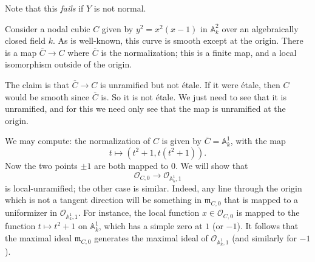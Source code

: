 Note that this \emph{fails} if $Y$ is not normal.
\begin{example} 
Consider a nodal cubic $C$ given by $y^2 = x^2 (x-1)$ in $\mathbb{A}^2_k$ over an
algebraically closed field $k$. As is well-known, this curve is smooth except
at the origin. There is a map $\overline{C} \to C$ where $\overline{C}$ is
the normalization; this is a finite map, and a local isomorphism outside of
the origin. 

The claim is that $\overline{C} \to C$ is unramified but not \'etale. If it
were \'etale, then $C$ would be smooth since $\overline{C}$ is. So it is not
\'etale. We just need to see that it is unramified, and for this we need only
see that the map is unramified at the origin.

We may compute: the normalization of $C$ is given by $\overline{C} =
\mathbb{A}^1_k$, with the map
\[ t \mapsto (t^2+1, t (t^2 + 1)).  \]
Now the two points $\pm 1$ are both mapped to $0$.
We will show that
\[ \mathcal{O}_{C, 0} \to \mathcal{O}_{\mathbb{A}^1_k, 1}  \]
is local-unramified; the other case is similar.
Indeed, any line through the origin which is not a tangent direction will be
something in $\mathfrak{m}_{C, 0}$ that is mapped to a uniformizer in $
\mathcal{O}_{\mathbb{A}^1_k, 1}$.
For instance, the local function $x \in \mathcal{O}_{C,0}$ is mapped to 
the function $t \mapsto t^2 + 1$ on $\mathbb{A}^1_k$, which has a simple zero
at $1$ (or $-1$).
It follows that the maximal ideal $\mathfrak{m}_{C,0}$ generates the maximal
ideal of $\mathcal{O}_{\mathbb{A}^1_k, 1}$ (and similarly for $-1$).
\end{example} 


